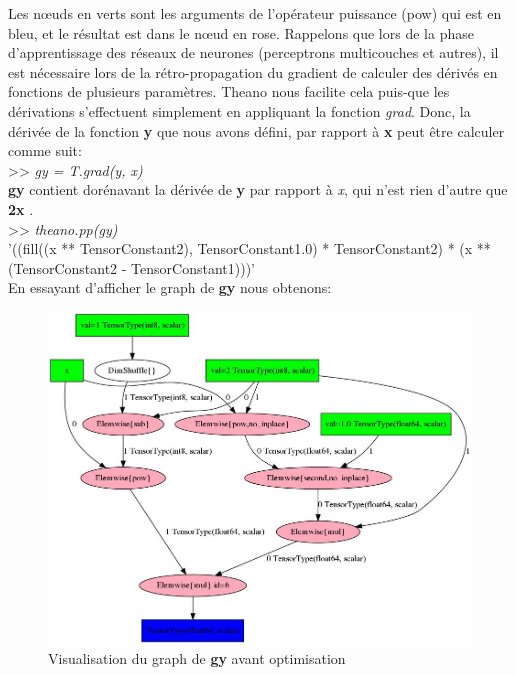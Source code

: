 	Les nœuds en verts sont les arguments de l'opérateur puissance (pow) qui est en bleu, et le résultat est dans le nœud en rose.
	Rappelons que lors de la phase d'apprentissage des réseaux de neurones (perceptrons multicouches et autres), il est nécessaire lors de la rétro-propagation du gradient de calculer des dérivés en fonctions de plusieurs paramètres. Theano nous facilite cela puis-que les dérivations s'effectuent simplement en appliquant la fonction \textit{grad}. 
Donc, la dérivée de la fonction \textbf{y} que nous avons défini, par rapport à \textbf{x} peut être calculer comme suit: \\

>> \textit{gy = T.grad(y, x)}\\

\textbf{gy} contient dorénavant la dérivée de \textbf{y} par rapport à \textit{x}, qui n'est rien d'autre que \textbf{2x} .\\

>> \textit{theano.pp(gy)}\\
 '((fill((x ** TensorConstant{2}), TensorConstant{1.0}) * TensorConstant{2}) * (x ** (TensorConstant{2} - TensorConstant{1})))'\\
 
En essayant d'afficher le graph de \textbf{gy} nous obtenons:

\begin{figure}[H]
	\centering
		\includegraphics[width=5in]{Figures/beforeOptimization.png}
	\caption[TheanoGraph]{Visualisation du graph de \textbf{gy} avant optimisation}
	\label{fig:Electron}
\end{figure}

